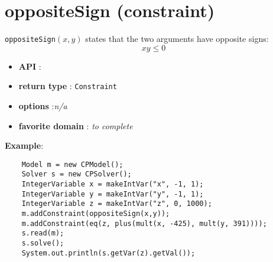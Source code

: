\label{oppositesign}
\hypertarget{oppositesign}{}

\section{oppositeSign (constraint)}\label{oppositesign:oppositesignconstraint}\hypertarget{oppositesign:oppositesignconstraint}{}


\begin{notedef}
  \texttt{oppositeSign}$(x,y)$ states that the two arguments have opposite signs:
$$xy\le 0$$
\end{notedef}

\begin{itemize}
	\item \textbf{API} : 
	\item \textbf{return type} : \texttt{Constraint}
	\item \textbf{options} :\emph{n/a}
	\item \textbf{favorite domain} : \emph{to complete}
\end{itemize}

\textbf{Example}:
\begin{lstlisting}
	Model m = new CPModel();
	Solver s = new CPSolver();
	IntegerVariable x = makeIntVar("x", -1, 1);
	IntegerVariable y = makeIntVar("y", -1, 1);
	IntegerVariable z = makeIntVar("z", 0, 1000);
	m.addConstraint(oppositeSign(x,y));
	m.addConstraint(eq(z, plus(mult(x, -425), mult(y, 391))));
	s.read(m);
	s.solve();
	System.out.println(s.getVar(z).getVal());
\end{lstlisting} 

